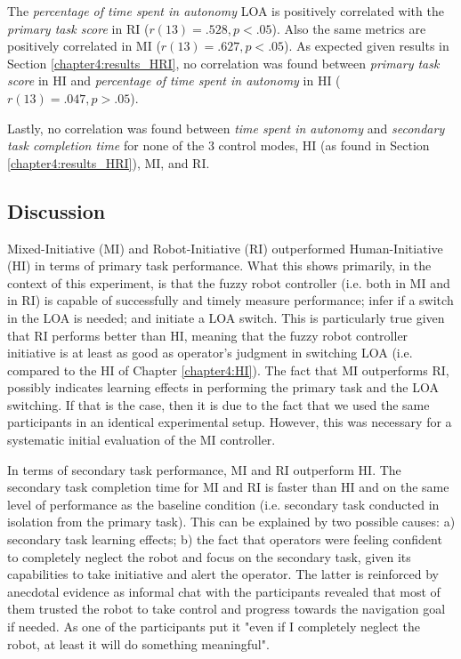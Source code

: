 \documentclass[a4paper,12pt,oneside,openright]{bhamthesis}
\begin{document}
The \textit{percentage of time spent in autonomy} LOA is positively correlated with the \textit{primary task score} in RI ($r(13)= .528, p<.05$). Also the same metrics are positively correlated in MI ($r(13)= .627, p<.05$). As expected given results in Section \ref{chapter4:results_HRI}, no correlation was found between \textit{primary task score} in HI and \textit{percentage of time spent in autonomy} in HI ($r(13)= .047, p>.05$).

Lastly, no correlation was found between \textit{time spent in autonomy} and \textit{secondary task completion time} for none of the 3 control modes, HI (as found in Section \ref{chapter4:results_HRI}), MI, and RI.


\subsection{Discussion}
Mixed-Initiative (MI) and Robot-Initiative (RI) outperformed Human-Initiative (HI) in terms of primary task performance. What this shows primarily, in the context of this experiment, is that the fuzzy robot controller (i.e. both in MI and in RI) is capable of successfully and timely measure performance; infer if a switch in the LOA is needed; and initiate a LOA switch. This is particularly true given that RI performs better than HI, meaning that the fuzzy robot controller initiative is at least as good as operator's judgment in switching LOA (i.e. compared to the HI of Chapter \ref{chapter4:HI}). The fact that MI outperforms RI, possibly indicates learning effects in performing the primary task and the LOA switching. If that is the case, then it is due to the fact that we used the same participants in an identical experimental setup. However, this was necessary for a systematic initial evaluation of the MI controller.

In terms of secondary task performance, MI and RI outperform HI. The secondary task completion time for MI and RI is faster than HI and on the same level of performance as the baseline condition (i.e. secondary task conducted in isolation from the primary task). This can be explained by two possible causes: a) secondary task learning effects; b) the fact that operators were feeling confident to completely neglect the robot and focus on the secondary task, given its capabilities to take initiative and alert the operator. The latter is reinforced by anecdotal evidence as informal chat with the participants revealed that most of them trusted the robot to take control and progress towards the navigation goal if needed. As one of the participants put it "even if I completely neglect the robot, at least it will do something meaningful".
\end{document}
